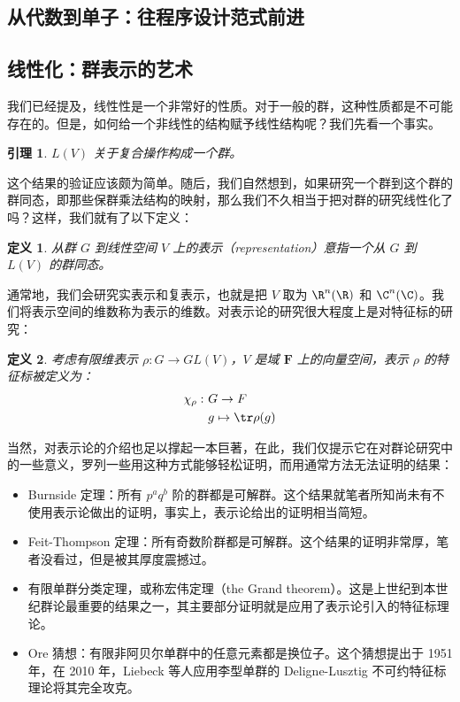 \documentclass{ctexbook}
\newtheorem{definition}{定义}[chapter] %
\newtheorem{lemma}{引理}[chapter]
\begin{document}
\subsection{从代数到单子：往程序设计范式前进}

\subsection{线性化：群表示的艺术}

我们已经提及，线性性是一个非常好的性质。对于一般的群，这种性质都是不可能存在的。但是，如何给一个非线性的结构赋予线性结构呢？我们先看一个事实。

\begin{lemma}
    $L(V)$ 关于复合操作构成一个群。
\end{lemma}

这个结果的验证应该颇为简单。随后，我们自然想到，如果研究一个群到这个群的群同态，即那些保群乘法结构的映射，那么我们不久相当于把对群的研究线性化了吗？这样，我们就有了以下定义：

\begin{definition}
    从群 $G$ 到线性空间 $V$ 上的表示（representation）意指一个从 $G$ 到 $L(V)$ 的群同态。
\end{definition}

通常地，我们会研究实表示和复表示，也就是把 $V$ 取为 $\R^n(\R)$ 和 $\C^n(\C)$。我们将表示空间的维数称为表示的维数。对表示论的研究很大程度上是对特征标的研究：

\begin{definition}
    考虑有限维表示 $\rho: G \to GL(V)$，$V$ 是域 $\mathbf{F}$ 上的向量空间，表示 $\rho$ 的特征标被定义为：
    \begin{align*}
        \chi_\rho:\ &  G \to F\\
        & g  \mapsto  \tr \rho(g)
    \end{align*}
\end{definition}

当然，对表示论的介绍也足以撑起一本巨著，在此，我们仅提示它在对群论研究中的一些意义，罗列一些用这种方式能够轻松证明，而用通常方法无法证明的结果：

\begin{itemize}
    \item Burnside 定理：所有 $p^aq^b$ 阶的群都是可解群。这个结果就笔者所知尚未有不使用表示论做出的证明，事实上，表示论给出的证明相当简短。
    \item Feit-Thompson 定理：所有奇数阶群都是可解群。这个结果的证明非常厚，笔者没看过，但是被其厚度震撼过。
    \item 有限单群分类定理，或称宏伟定理（the Grand theorem）。这是上世纪到本世纪群论最重要的结果之一，其主要部分证明就是应用了表示论引入的特征标理论。
    \item Ore 猜想：有限非阿贝尔单群中的任意元素都是换位子。这个猜想提出于 1951 年，在 2010 年，Liebeck 等人应用李型单群的 Deligne-Lusztig 不可约特征标理论将其完全攻克。
\end{itemize}
\end{document}
